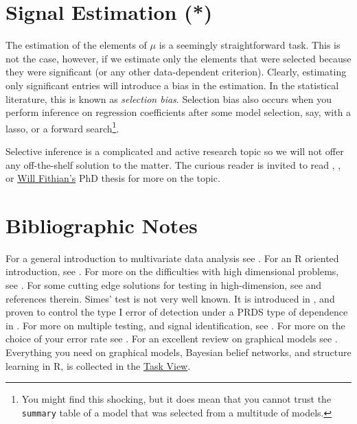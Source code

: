 \documentclass[]{book}
\theoremstyle{definition}
\theoremstyle{definition}
\theoremstyle{definition}
\theoremstyle{remark}
\begin{document}
\section{Signal Estimation (*)}\label{signal-estimation}

The estimation of the elements of \(\mu\) is a seemingly straightforward
task. This is not the case, however, if we estimate only the elements
that were selected because they were significant (or any other
data-dependent criterion). Clearly, estimating only significant entries
will introduce a bias in the estimation. In the statistical literature,
this is known as \emph{selection bias}. Selection bias also occurs when
you perform inference on regression coefficients after some model
selection, say, with a lasso, or a forward search\footnote{You might
  find this shocking, but it does mean that you cannot trust the
  \texttt{summary} table of a model that was selected from a multitude
  of models.}.

Selective inference is a complicated and active research topic so we
will not offer any off-the-shelf solution to the matter. The curious
reader is invited to read \citet{rosenblatt2014selective},
\citet{javanmard2014confidence}, or
\href{http://www.stat.berkeley.edu/~wfithian/}{Will Fithian's} PhD
thesis \citep{fithian2015topics} for more on the topic.

\section{Bibliographic Notes}\label{bibliographic-notes-7}

For a general introduction to multivariate data analysis see
\citet{anderson2004introduction}. For an R oriented introduction, see
\citet{everitt2011introduction}. For more on the difficulties with high
dimensional problems, see \citet{bai1996effect}. For some cutting edge
solutions for testing in high-dimension, see
\citet{rosenblatt2016better} and references therein. Simes' test is not
very well known. It is introduced in \citet{simes1986improved}, and
proven to control the type I error of detection under a PRDS type of
dependence in \citet{benjamini2001control}. For more on multiple
testing, and signal identification, see \citet{efron2012large}. For more
on the choice of your error rate see \citet{rosenblatt2013practitioner}.
For an excellent review on graphical models see
\citet{kalisch2014causal}. Everything you need on graphical models,
Bayesian belief networks, and structure learning in R, is collected in
the \href{https://cran.r-project.org/web/views/gR.html}{Task View}.
\end{document}
